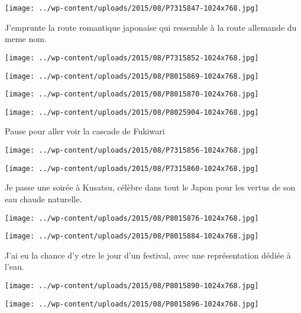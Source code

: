 \centerline{\texttt{[image: ../wp-content/uploads/2015/08/P7315847-1024x768.jpg]} } 
 \newline
 J'emprunte la route romantique japonaise qui ressemble à la route allemande du meme nom. \newline
 \newline
\centerline{\texttt{[image: ../wp-content/uploads/2015/08/P7315852-1024x768.jpg]} } 
 \newline
 \newline
\centerline{\texttt{[image: ../wp-content/uploads/2015/08/P8015869-1024x768.jpg]} } 
 \newline
 \newline
\centerline{\texttt{[image: ../wp-content/uploads/2015/08/P8015870-1024x768.jpg]} } 
 \newline
 \newline
\centerline{\texttt{[image: ../wp-content/uploads/2015/08/P8025904-1024x768.jpg]} } 
 \newline
 Pause pour aller voir la cascade de Fukiwari \newline
 \newline
\centerline{\texttt{[image: ../wp-content/uploads/2015/08/P7315856-1024x768.jpg]} } 
 \newline
 \newline
\centerline{\texttt{[image: ../wp-content/uploads/2015/08/P7315860-1024x768.jpg]} } 
 \newline
 Je passe une soirée à Kusatsu, célèbre dans tout le Japon pour les vertus de son eau chaude naturelle. \newline
 \newline
\centerline{\texttt{[image: ../wp-content/uploads/2015/08/P8015876-1024x768.jpg]} } 
 \newline
 \newline
\centerline{\texttt{[image: ../wp-content/uploads/2015/08/P8015884-1024x768.jpg]} } 
 \newline
 J'ai eu la chance d'y etre le jour d'un festival, avec une représentation dédiée à l'eau. \newline
 \newline
\centerline{\texttt{[image: ../wp-content/uploads/2015/08/P8015890-1024x768.jpg]} } 
 \newline
 \newline
\centerline{\texttt{[image: ../wp-content/uploads/2015/08/P8015896-1024x768.jpg]} } 
